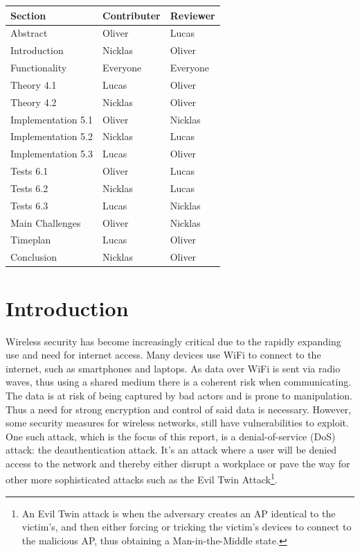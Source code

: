 \begin{table}[!htbp]
\centering
\begin{tabular}{|l|l|l|}
\hline

\textbf{Section}   & \textbf{Contributer} & \textbf{Reviewer} \\ \hline
Abstract           & Oliver               & Lucas             \\ \hline
Introduction       & Nicklas              & Oliver            \\ \hline
Functionality      & Everyone             & Everyone          \\ \hline
Theory 4.1         & Lucas                & Oliver            \\ \hline
Theory 4.2         & Nicklas              & Oliver            \\ \hline
Implementation 5.1 & Oliver               & Nicklas           \\ \hline
Implementation 5.2 & Nicklas              & Lucas             \\ \hline
Implementation 5.3 & Lucas                & Oliver            \\ \hline
Tests 6.1          & Oliver               & Lucas             \\ \hline
Tests 6.2          & Nicklas              & Lucas             \\ \hline
Tests 6.3          & Lucas                & Nicklas           \\ \hline
Main Challenges    & Oliver               & Nicklas           \\ \hline
Timeplan           & Lucas                & Oliver            \\ \hline
Conclusion         & Nicklas              & Oliver            \\ \hline
\end{tabular}
\end{table}

\section{Introduction}
Wireless security has become increasingly critical due to the rapidly expanding use and need for internet access. Many devices use WiFi to connect to the internet, such as smartphones and laptops. As data over WiFi is sent via radio waves, thus using a shared medium there is a coherent risk when communicating. The data is at risk of being captured by bad actors and is prone to manipulation. Thus a need for strong encryption and control of said data is necessary. However, some security measures for wireless networks, still have vulnerabilities to exploit. One such attack, which is the focus of this report, is a denial-of-service (DoS) attack: the deauthentication attack. It's an attack where a user will be denied access to the network and thereby either disrupt a workplace or pave the way for other more sophisticated attacks such as the Evil Twin Attack\footnote{An Evil Twin attack is when the adversary creates an AP identical to the victim's, and then either forcing or tricking the victim's devices to connect to the malicious AP, thus obtaining a Man-in-the-Middle state.}.

